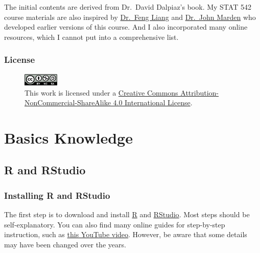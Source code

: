 \documentclass[
]{book}
\begin{document}
The initial contents are derived from Dr.~David Dalpiaz's book. My STAT 542 course materials are also inspired by \href{https://stat.illinois.edu/directory/profile/liangf}{Dr.~Feng Liang} and \href{https://stat.illinois.edu/directory/profile/jimarden}{Dr.~John Marden} who developed earlier versions of this course. And I also incorporated many online resources, which I cannot put into a comprehensive list.

\hypertarget{license}{%
\section*{License}\label{license}}

\begin{figure}
\centering
\includegraphics[width=0.15\textwidth,height=\textheight]{images/cc.png}
\caption{This work is licensed under a \href{http://creativecommons.org/licenses/by-nc-sa/4.0/}{Creative Commons Attribution-NonCommercial-ShareAlike 4.0 International License}.}
\end{figure}

\hypertarget{part-basics-knowledge}{%
\part{Basics Knowledge}\label{part-basics-knowledge}}

\hypertarget{r-and-rstudio}{%
\chapter{R and RStudio}\label{r-and-rstudio}}

\hypertarget{installing-r-and-rstudio}{%
\section{Installing R and RStudio}\label{installing-r-and-rstudio}}

The first step is to download and install \href{https://www.r-project.org/}{R} and \href{https://www.rstudio.com/products/rstudio/download/\#download}{RStudio}. Most steps should be self-explanatory. You can also find many online guides for step-by-step instruction, such as \href{https://www.youtube.com/watch?v=cX532N_XLIs\&t=19s/}{this YouTube video}. However, be aware that some details may have been changed over the years.
\end{document}
